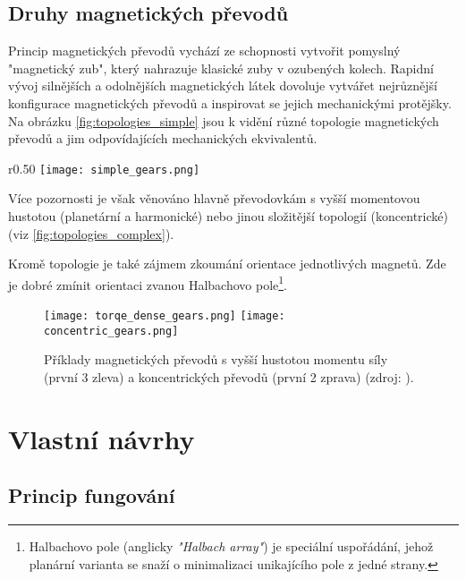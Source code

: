 \subsection{Druhy magnetických převodů}
Princip magnetických převodů vychází ze schopnosti vytvořit pomyslný "magnetický zub", který nahrazuje klasické zuby v ozubených kolech. Rapidní vývoj silnějších a odolnějších magnetických látek dovoluje vytvářet nejrůznější konfigurace magnetických převodů a inspirovat se jejich mechanickými protějšky. Na obrázku \ref{fig:topologies_simple} jsou k vidění různé topologie magnetických převodů a jim odpovídajících mechanických ekvivalentů.
\begin{wrapfigure}{r}{0.50\textwidth}
    \vspace{-5cm}
    \texttt{[image: simple\_gears.png]}
    \centering
    \caption{Základní magnetické topologie a jejich mechanické ekvivalenty (zdroj: \cite{MG_topologies}).}
    \label{fig:topologies_simple}
\end{wrapfigure}

Více pozornosti je však věnováno hlavně převodovkám s vyšší momentovou hustotou (planetární a harmonické) nebo jinou složitější topologií (koncentrické) (viz \autoref{fig:topologies_complex}).

Kromě topologie je také zájmem zkoumání orientace jednotlivých magnetů. Zde je dobré zmínit orientaci zvanou Halbachovo pole\footnote{Halbachovo pole (anglicky \textit{"Halbach array"}) je speciální uspořádání, jehož planární varianta se snaží o minimalizaci unikajícího pole z jedné strany.}.
\begin{figure}[H]
    \texttt{[image: torqe\_dense\_gears.png]}
    \texttt{[image: concentric\_gears.png]}
    \centering
    \caption[Příklady magnetických převodů s vyšší hustotou momentu síly a koncentrických převodů]{Příklady magnetických převodů s vyšší hustotou momentu síly (první 3 zleva) a koncentrických převodů (první 2 zprava) (zdroj: \cite{MG_topologies}).}
    \label{fig:topologies_complex}
\end{figure}

\section{Vlastní návrhy}

\subsection{Princip fungování}

